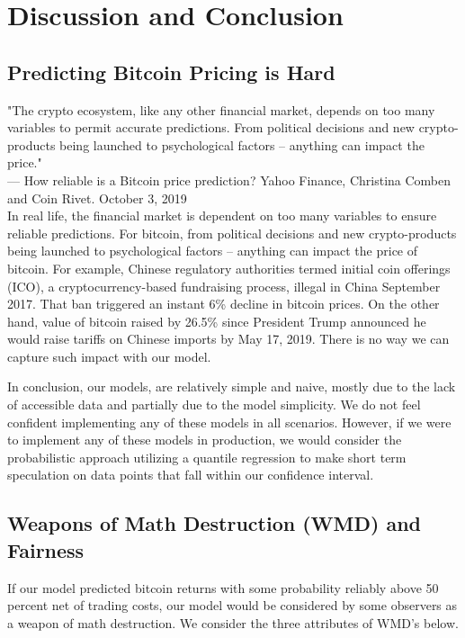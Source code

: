 \documentclass[9pt,twocolumn,twoside]{ilcss}
\begin{document}
\section{Discussion and Conclusion}
\subsection*{Predicting Bitcoin Pricing is Hard}
"The crypto ecosystem, like any other financial market, depends on too many variables to permit accurate predictions. From political decisions and new crypto-products being launched to psychological factors – anything can impact the price."
\\[3pt]
--- How reliable is a Bitcoin price prediction? Yahoo Finance, Christina Comben and Coin Rivet. October 3, 2019
\\[3pt]

In real life, the financial market is dependent on too many variables to ensure reliable predictions. For bitcoin, from political decisions and new crypto-products being launched to psychological factors – anything can impact the price of bitcoin. For example, Chinese regulatory authorities termed initial coin offerings (ICO), a cryptocurrency-based fundraising process, illegal in China September 2017. That ban triggered an instant 6\% decline in bitcoin prices. On the other hand, value of bitcoin raised by 26.5\% since President Trump announced he would raise tariffs on Chinese imports by May 17, 2019. There is no way we can capture such impact with our model. 

In conclusion, our models, are relatively simple and naive, mostly due to the lack of accessible data and partially due to the model simplicity. We do not feel confident implementing any of these models in all scenarios. However, if we were to implement any of these models in production, we would consider the probabilistic approach utilizing a quantile regression to make short term speculation on data points that fall within our confidence interval.

\subsection*{Weapons of Math Destruction (WMD) and Fairness}
If our model predicted bitcoin returns with some probability reliably above 50 percent net of trading costs, our model would be considered by some observers as a weapon of math destruction.  We consider the three attributes of WMD's below.
\end{document}
